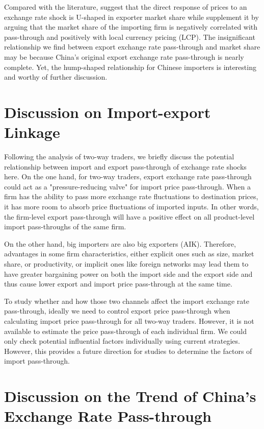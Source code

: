 Compared with the literature, \cite{auer2016} suggest that the direct response of prices to an exchange rate shock is U-shaped in exporter market share while \cite{devereux2017} supplement it by arguing that the market share of the importing firm is negatively correlated with pass-through and positively with local currency pricing (LCP). The insignificant relationship we find between export exchange rate pass-through and market share may be because China's original export exchange rate pass-through is nearly complete. Yet, the hump-shaped relationship for Chinese importers is interesting and worthy of further discussion.

\section{Discussion on Import-export Linkage} \label{sec-6.3}

Following the analysis of two-way traders, we briefly discuss the potential relationship between import and export pass-through of exchange rate shocks here. On the one hand, for two-way traders, export exchange rate pass-through could act as a "pressure-reducing valve" for import price pass-through. When a firm has the ability to pass more exchange rate fluctuations to destination prices, it has more room to absorb price fluctuations of imported inputs. In other words, the firm-level export pass-through will have a positive effect on all product-level import pass-throughs of the same firm.

On the other hand, big importers are also big exporters (AIK\cite{aik2014}). Therefore, advantages in some firm characteristics, either explicit ones such as size, market share, or productivity, or implicit ones like foreign networks may lead them to have greater bargaining power on both the import side and the export side and thus cause lower export and import price pass-through at the same time. 

To study whether and how those two channels affect the import exchange rate pass-through, ideally we need to control export price pass-through when calculating import price pass-through for all two-way traders. However, it is not available to estimate the price pass-through of each individual firm. We could only check potential influential factors individually using current strategies. However, this provides a future direction for studies to determine the factors of import pass-through.

\section{Discussion on the Trend of China’s Exchange Rate Pass-through}

